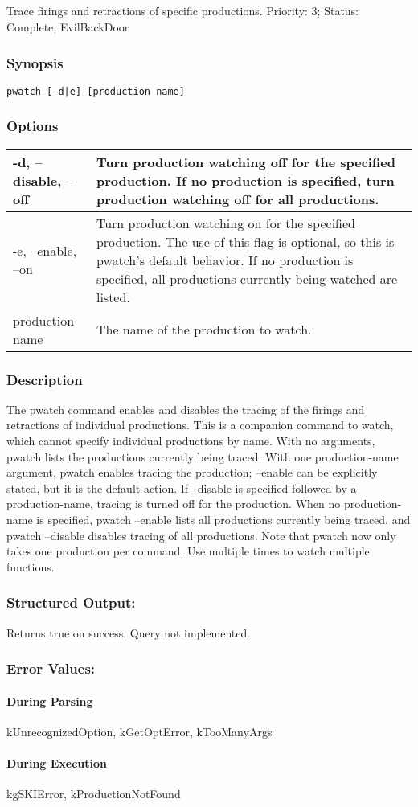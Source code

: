 \subsection{}
\label{pwatch}
Trace firings and retractions of specific productions. 
 Priority: 3; Status: Complete, EvilBackDoor
\subsubsection*{Synopsis}
\begin{verbatim}
pwatch [-d|e] [production name]
\end{verbatim}
\subsubsection*{Options}
\begin{tabular}{|l|l|}
\hline 
 -d, --disable, --off  & Turn production watching off for the specified production. If no production is specified, turn production watching off for all productions.  \\
 \hline 
 -e, --enable, --on  & Turn production watching on for the specified production. The use of this flag is optional, so this is pwatch's default behavior. If no production is specified, all productions currently being watched are listed.  \\
 \hline 
production name & The name of the production to watch.  \\
 \hline 
\end{tabular}
\subsubsection*{Description}
 The pwatch command enables and disables the tracing of the firings and retractions of individual productions. This is a companion command to watch, which cannot specify individual productions by name. 
 With no arguments, pwatch lists the productions currently being traced. With one production-name argument, pwatch enables tracing the production; --enable can be explicitly stated, but it is the default action. 
 If --disable is specified followed by a production-name, tracing is turned off for the production. When no production-name is specified, pwatch --enable lists all productions currently being traced, and pwatch --disable disables tracing of all productions. 
 Note that pwatch now only takes one production per command. Use multiple times to watch multiple functions. 
\subsubsection*{Structured Output:}
 Returns true on success. Query not implemented. 
\subsubsection*{Error Values:}
\paragraph*{During Parsing}
 kUnrecognizedOption, kGetOptError, kTooManyArgs
\paragraph*{During Execution}
 kgSKIError, kProductionNotFound
